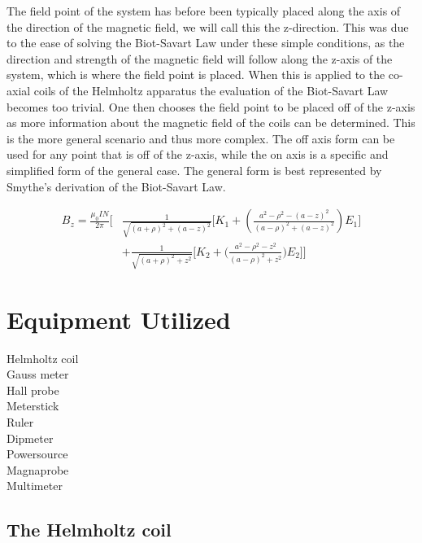 \documentclass[a4paper]{article}
\begin{document}
The field point of the system has before been typically placed along
the axis of the direction of the magnetic field, we will call this the
z-direction. This was due to the ease of solving the Biot-Savart Law
under these simple conditions, as the direction and strength of the
magnetic field will follow along the z-axis of the system, which is
where the field point is placed. When this is applied to the co-axial
coils of the Helmholtz apparatus the evaluation of the Biot-Savart Law
becomes too trivial. One then chooses the field point to be placed off
of the z-axis as more information about the magnetic field of the
coils can be determined. This is the more general scenario and thus
more complex. The off axis form can be used for any point that is off
of the z-axis, while the on axis is a specific and simplified form of
the general case. The general form is best represented by Smythe's
derivation of the Biot-Savart Law.

\begin{align*} 
B_z = \frac{\mu_0IN}{2\pi}
\Big[&
    \frac{1}{\sqrt{(a+\rho)^2 + (a-z)^2}}
    \big[
        K_1 + \left(\frac{a^2 -\rho^2 - (a - z)^2}{(a-\rho)^2 + (a - z)^2} \right) E_1 
    \big]\\
    & + \frac{1}{\sqrt{(a + \rho)^2 + z^2}}
    \big[
        K_2 + \big(\frac{a^2 - \rho^2 - z^2}{(a - \rho)^2 + z^2}\big) E_2 
    \big] 
\Big]
\end{align*}

\section{Equipment Utilized}


Helmholtz coil \\
Gauss meter \\
Hall probe \\
Meterstick \\
Ruler \\
Dipmeter \\
Powersource \\
Magnaprobe \\
Multimeter\\

\subsection{The Helmholtz coil}
\end{document}
